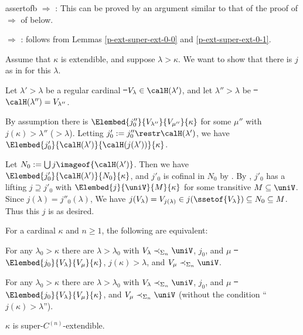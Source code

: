 assertof{b} $\Rightarrow$ : This can be proved by an argument similar to that
of the proof of  $\Rightarrow$  of  below.

 $\Rightarrow$ :
follows from Lemmas \ref{p-ext-super-ext-0-0} and \ref{p-ext-super-ext-0-1}.
{\ifextended\extendedcolor\smallskip

 Assume that $\kappa$ is extendible, and suppose $\lambda>\kappa$. We want to show
 that there is $j$ as in  for this $\lambda$.

 Let $\lambda'>\lambda$ be a regular cardinal \st\ $V_\lambda\in\calH(\lambda')$, and let
 $\lambda''>\lambda$ be \st\ $\calH(\lambda'')=V_{\lambda''}$.

 By assumption there is $\Elembed{j''_0}{V_{\lambda''}}{V_{\mu''}}{\kappa}$ for
 some $\mu''$ with $j(\kappa)>\lambda''$ ($>\lambda$). Letting $j'_0:=j''_0\restr\calH(\lambda')$, we have
 $\Elembed{j'_0}{\calH(\lambda')}{\calH(j(\lambda'))}{\kappa}$.

 Let $N_0:=\bigcup j\imageof{\calH(\lambda')}$. Then we have
 $\Elembed{j'_0}{\calH(\lambda')}{N_0}{\kappa}$, and $j'_0$ is cofinal in $N_0$ by
 . By , $j'_0$ has a lifting
 $j\supseteq j'_0$ with $\Elembed{j}{\uniV}{M}{\kappa}$ for some transitive
 $M\subseteq\uniV$. Since $j(\lambda)=j''_0(\lambda)$, We have
 $j(V_\lambda)=V_{j(\lambda)}\in j(\ssetof{V_\lambda})\subseteq N_0\subseteq M$. Thus this
 $j$ is as desired.



\begin{Prop}
 For a cardinal $\kappa$ and $n\geq1$, the following are equivalent:\smallskip

  For any $\lambda_0>\kappa$ there are $\lambda>\lambda_0$ with
 $V_\lambda\prec_{\Sigma_n}\uniV$, $j_0$, and $\mu$ \st\
 $\Elembed{j_0}{V_\lambda}{V_\mu}{\kappa}$, $j(\kappa)>\lambda$, and
 $V_\mu\prec_{\Sigma_n}\uniV$. \smallskip

  For any $\lambda_0>\kappa$ there are $\lambda>\lambda_0$ with
 $V_\lambda\prec_{\Sigma_n}\uniV$, $j_0$, and $\mu$ \st\
 $\Elembed{j_0}{V_\lambda}{V_\mu}{\kappa}$, and
 $V_\mu\prec_{\Sigma_n}\uniV$ (without the condition ``$j(\kappa)>\lambda$''). \smallskip

 \wassert{a$'$} $\kappa$ is super-$C^{(n)}$-extendible.


\end{Prop}}

